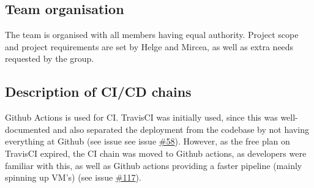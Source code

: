 

\subsection{Team organisation}
The team is organised with all members having equal authority. Project scope and project requirements are set by Helge and Mircea, as well as extra needs requested by the group. 

\subsection{Description of CI/CD chains}
Github Actions is used for CI. TravisCI was initially used, since this was well-documented and also separated the deployment from the codebase by not having everything at Github (see issue see issue \href{https://github.com/DevelOpsITU/MiniTwit/issues/58}{\#58}). However, as the free plan on TravisCI expired, the CI chain was moved to Github actions, as developers were familiar with this, as well as Github actions providing a faster pipeline (mainly spinning up VM's) (see issue \href{https://github.com/DevelOpsITU/MiniTwit/issues/117}{\#117}).\\

